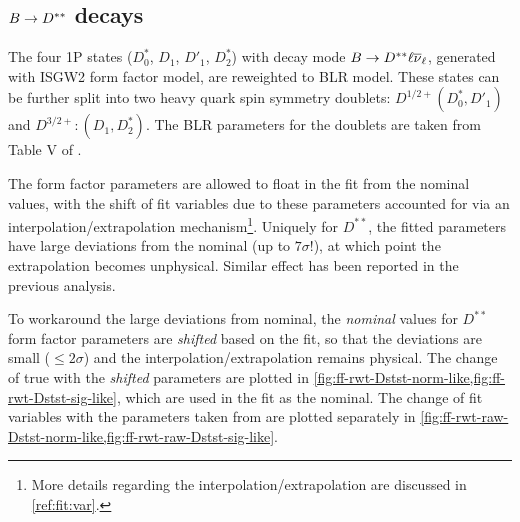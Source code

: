 \subsection{$B \rightarrow D^{**}$ decays}
The four 1P \Dstst states ($D^*_0$, $D_1$, $D'_1$, $D^*_2$) with decay mode
$B \rightarrow D^{**}{\ell}{{\overline{\nu}}_\ell}$,
generated with ISGW2 form factor model,
are reweighted to BLR model.
These \Dstst states can be further split into two heavy quark spin symmetry
doublets: $D^{1/2+} (D^*_0, D'_1)$ and $D^{3/2+}: (D_1, D^*_2)$.
The BLR parameters for the doublets are taken from Table V of
\cite{Bernlochner_2018}.

The form factor parameters are allowed to float in the fit from the nominal
values, with the shift of fit variables due to these parameters accounted for
via an interpolation/extrapolation mechanism\footnote{
    More details regarding the interpolation/extrapolation are discussed
    in \cref{ref:fit:var}.
}.
Uniquely for $D^{**}$, the fitted parameters have large deviations from the
nominal (up to $7\sigma$!), at which point the extrapolation becomes
unphysical.
Similar effect has been reported in the previous analysis.

To workaround the large deviations from nominal, the \emph{nominal} values for
$D^{**}$ form factor parameters are \emph{shifted} based on the fit, so that
the deviations are small ($\leq 2\sigma$) and the
interpolation/extrapolation remains physical.
The change of true \qSq with the \emph{shifted} parameters are
plotted in \cref{fig:ff-rwt-Dstst-norm-like,fig:ff-rwt-Dstst-sig-like},
which are used in the fit as the nominal.
The change of fit variables with the parameters taken from
\cite{Bernlochner_2018} are plotted separately in
\cref{fig:ff-rwt-raw-Dstst-norm-like,fig:ff-rwt-raw-Dstst-sig-like}.

